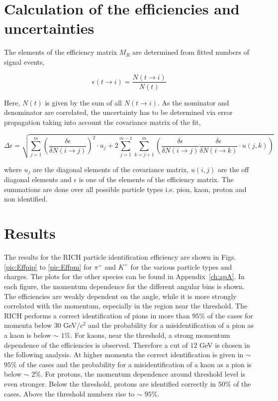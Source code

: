 \section{Calculation of the efficiencies and uncertainties}

The elements of the efficiency matrix $M_R$ are determined from fitted numbers of signal events,

\begin{equation}
  \epsilon(t\rightarrow i) = \frac{N(t\rightarrow i)}{N(t)}
\end{equation}

Here, $N(t)$ is given by the sum of all $N(t \rightarrow i)$. As the nominator and denominator are correlated, the uncertainty has to be determined via error propagation taking into account the covariance matrix of the fit,

\begin{equation}
  \Delta \epsilon = \sqrt{\sum_{j=1}^m \left( \frac{\delta \epsilon}{\delta N(i\rightarrow j)} \right)^2 \cdot u_j + 2 \sum_{j=1}^{m-1} \sum_{k=j+1}^{m} \left( \frac{\delta \epsilon}{\delta N(i\rightarrow j)} \frac{\delta \epsilon}{\delta N(i\rightarrow k)} \cdot u(j,k) \right)}
\end{equation}

where $u_j$ are the diagonal elements of the covariance matrix, $u(i,j)$ are the off diagonal elements and $\epsilon$ is one of the elements of the efficiency matrix. The summations are done over all possible particle types i.e. pion, kaon, proton and non identified.

\section{Results} \label{sec:Results}

The results for the RICH particle identification efficiency are shown in Figs. \ref{pic:Effpip} to \ref{pic:Effpm} for $\pi^+$ and $K^+$ for the various particle types and charges. The plots for the other species can be found in Appendix~\ref{ch:apA}. In each figure, the momentum dependence for the different angular bins is shown. The efficiencies are weakly dependent on the angle, while it is more strongly correlated with the momentum, especially in the region near the threshold.
The RICH performs a correct identification of pions in more than $95$\% of the cases for momenta below 30 GeV/$c^2$ and the probability for a misidentification of a pion as a kaon is below $\sim$ $1$\%. For kaons, near the threshold, a strong momentum dependence of the efficiencies is observed. Therefore a cut of $12$ GeV is chosen in the following analysis. At higher momenta the correct identification is given in $\sim$ $95$\% of the cases and the probability for a misidentification of a kaon as a pion is below $\sim$ $2$\%. For protons, the momentum dependence around threshold level is even stronger. Below the threshold, protons are identified correctly in $50$\% of the cases. Above the threshold numbers rise to $\sim$ $95$\%.

